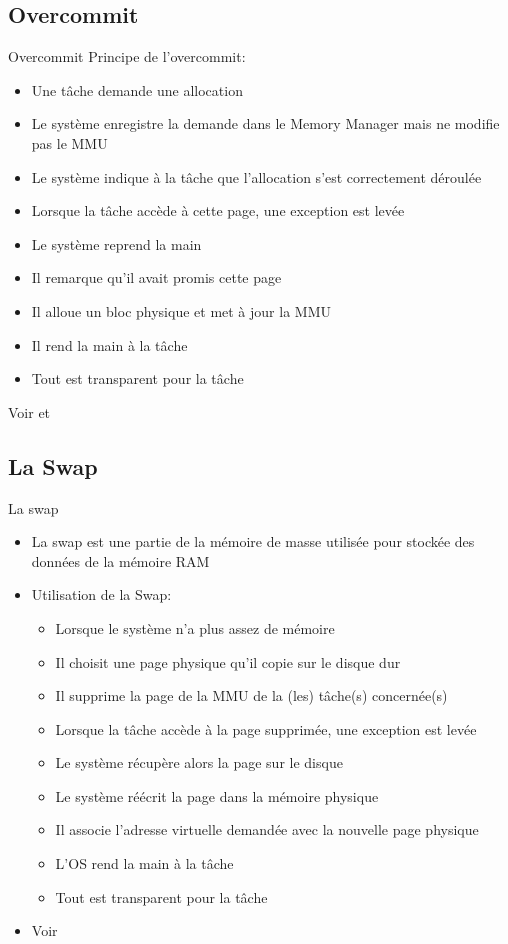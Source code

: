 \subsection{Overcommit}

\begin{frame}{Overcommit}
  Principe de l'overcommit:
  \begin{itemize}
  \item Une tâche demande une allocation
  \item Le système  enregistre la demande dans le  Memory Manager mais
    ne modifie pas le MMU
  \item  Le  système  indique   à  la  tâche  que  l'allocation  s'est
    correctement déroulée
  \item Lorsque la tâche accède à cette page, une exception est levée
  \item Le système reprend la main
  \item Il remarque qu'il avait promis cette page
  \item Il alloue un bloc physique et met à jour la MMU
  \item Il rend la main à la tâche
  \item Tout est transparent pour la tâche
  \end{itemize}
  Voir                         et
\end{frame}

\subsection{La Swap}

\begin{frame}{La swap}
  \begin{itemize}
  \item La  swap est une partie  de la mémoire de  masse utilisée pour
    stockée des données de la mémoire RAM
  \item Utilisation de la Swap:
  \begin{itemize}
  \item Lorsque le système n'a plus assez de mémoire
  \item Il choisit une page physique qu'il copie sur le disque dur
  \item  Il  supprime  la  page   de  la  MMU  de  la  (les)  tâche(s)
    concernée(s)
  \item Lorsque la tâche accède à la page supprimée, une exception est
    levée
  \item Le système récupère alors la page sur le disque
  \item Le système réécrit la page dans la mémoire physique
  \item Il associe l'adresse virtuelle demandée avec la nouvelle page
    physique
  \item L'OS rend la main à la tâche
  \item Tout est transparent pour la tâche
  \end{itemize}
\item Voir 
\end{itemize}
\end{frame}


